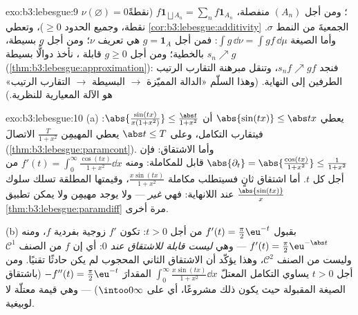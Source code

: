 \begin{solution}{exo:b3:lebesgue:9}
$\nu(\varnothing) = 0$؛ ومن أجل $(A_n)$ منفصلة، $f\mathbf
1_{\bigsqcup A_n} = \sum_nf\mathbf 1_{A_n}$ (نقطةً نقطة، وجميع
الحدود $\geq 0$)، وتعطي \cref{cor:b3:lebesgue:additivity} الجمعيةَ من النمط $\sigma$.
وأما الصيغة $\int g\,\dd\nu = \int
gf\,\dd\mu$: فمن أجل $g = \mathbf 1_A$ هي تعريف $\nu$؛ ومن أجل $g$
بسيطة، بالخطية؛ ومن أجل $g \geq 0$ قابلة ، نأخذ دوالًّا
بسيطة $s_n \nearrow g$ (\cref{thm:b3:lebesgue:approximation}): فنجد $s_nf \nearrow gf$، وتنقل مبرهنة
التقارب الرتيب الطرفين إلى النهاية. (وهذا السلّم «الدالة
المميّزة $\to$ البسيطة $\to$ التقارب الرتيب» هو الآلة المعيارية
للنظرية.)
\end{solution}

\begin{solution}{exo:b3:lebesgue:10}
(a) يعطي $\abs{\sin(tx)} \leq \abs tx$ أن $\abs{\frac{\sin(tx)}{x(1+x^2)}} \leq \frac{\abs
t}{1+x^2}$: فيتقارب التكامل، وعلى $\abs t \leq T$
يعطي المهيمِن $\frac{T}{1+x^2}$ الاتصالَ (\cref{thm:b3:lebesgue:paramcont}). وأما الاشتقاق:
فإن $\abs{\partial_t} = \abs{\frac{\cos(tx)}{1+x^2}} \leq
\frac1{1+x^2}$ قابل للمكاملة: ومنه $f'(t) =
\int_0^\infty\frac{\cos(tx)}{1+x^2}\dd x$ من أجل كل $t$. أما اشتقاق
ثانٍ فسيتطلب مكاملة $\frac{x\sin(tx)}{1 +
x^2}$، وقيمتها المطلقة تسلك سلوك $\frac{\abs{\sin(tx)}}
x$
عند اللانهاية: فهي \emph{غير}  --- ولا يوجد
مهيمِن ولا يمكن تطبيق \cref{thm:b3:lebesgue:paramdiff} مرة أخرى.

(b) بقبول $f'(t) = \frac\pi2\eu^{-t}$ من أجل $t > 0$: تكون $f'$ زوجية بفردية $f$،
ومنه $f'(t) =
\frac\pi2\eu^{-\abs t}$ --- وهي \emph{ليست قابلة للاشتقاق عند $0$}: أي إن
$f$ من الصنف $\mathcal C^1$ وليست من الصنف $\mathcal C^2$، وهذا
يؤكّد أن الاشتقاق الثاني المحجوب لم يكن حادثًا تقنيًا. ومن أجل
$t > 0$ يساوي التكامل المعتلّ $\int_0^\infty\frac{x\sin(tx)}{1+x^2}\dd x$ المقدارَ $-f''(t) =
\frac\pi2\eu^{-t}$ (باشتقاق
الصيغة المقبولة حيث يكون ذلك مشروعًا، أي على $\intoo0\infty$)
--- وهي قيمة معتلّة لا لوبيغية.
\end{solution}

